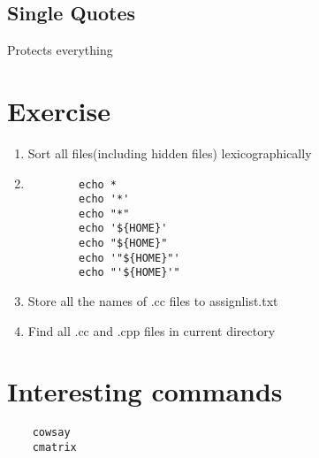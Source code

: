 \documentclass[12pt]{article}
\begin{document}
\subsection{Single Quotes}
Protects everything

\section{Exercise}
\begin{enumerate}
    \item Sort all files(including hidden files) lexicographically
    \item \begin{verbatim}
        echo *
        echo '*'
        echo "*"
        echo '${HOME}'
        echo "${HOME}"
        echo '"${HOME}"'
        echo "'${HOME}'"
    \end{verbatim}
    \item Store all the names of .cc files to assignlist.txt
    \item Find all .cc and .cpp files in current directory
\end{enumerate}

\section{Interesting commands}
\begin{verbatim}
    cowsay
    cmatrix 
\end{verbatim}
\end{document}
